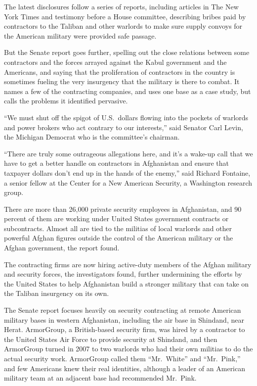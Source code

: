 ﻿\documentclass[12pt]{article}
\begin{document}
The latest disclosures follow a series of reports, including articles in The New York Times and
testimony before a House committee, describing bribes paid by contractors to the Taliban and other
warlords to make sure supply convoys for the American military were provided safe passage.

But the Senate report goes further, spelling out the close relations between some contractors and
the forces arrayed against the Kabul government and the Americans, and saying that the proliferation
of contractors in the country is sometimes fueling the very insurgency that the military is there to
combat. It names a few of the contracting companies, and uses one base as a case study, but calls
the problems it identified pervasive.

``We must shut off the spigot of U.S.~dollars flowing into the pockets of warlords and power brokers
who act contrary to our interests,'' said Senator Carl Levin, the Michigan Democrat who is the
committee's chairman.

``There are truly some outrageous allegations here, and it's a wake-up call that we have to get a
better handle on contractors in Afghanistan and ensure that taxpayer dollars don't end up in the
hands of the enemy,'' said Richard Fontaine, a senior fellow at the Center for a New American
Security, a Washington research group.

There are more than 26,000 private security employees in Afghanistan, and 90 percent of them are
working under United States government contracts or subcontracts. Almost all are tied to the
militias of local warlords and other powerful Afghan figures outside the control of the American
military or the Afghan government, the report found.

The contracting firms are now hiring active-duty members of the Afghan military and security forces,
the investigators found, further undermining the efforts by the United States to help Afghanistan
build a stronger military that can take on the Taliban insurgency on its own.

The Senate report focuses heavily on security contracting at remote American military bases in
western Afghanistan, including the air base in Shindand, near Herat. ArmorGroup, a British-based
security firm, was hired by a contractor to the United States Air Force to provide security at
Shindand, and then ArmorGroup turned in 2007 to two warlords who had their own militias to do the
actual security work. ArmorGroup called them ``Mr.~White'' and ``Mr.~Pink,'' and few Americans knew
their real identities, although a leader of an American military team at an adjacent base had
recommended Mr.~Pink.
\end{document}
